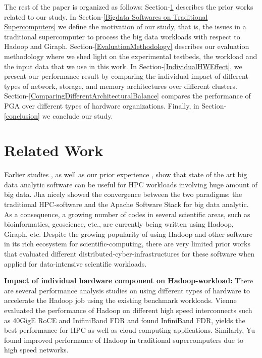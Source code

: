 \documentclass[conference]{IEEEtran}
\begin{document}
The rest of the paper is organized as follows:
Section-\ref{Related Work} describes the prior works related to our study. 
In Section-\ref{Bigdata Softwares on Traditional Supercomputers} we define the motivation of our study, that is, the issues in a traditional supercomputer to process the big data workloads with respect to Hadoop and Giraph. Section-\ref{EvaluationMethodology} describes our evaluation methodology where we shed light on the experimental testbeds, the workload and the input data that we use in this work. In Section-\ref{IndividualHWEffect}, we present our performance result by comparing the individual impact of different types of network, storage, and memory architectures over different clusters. Section-\ref{ComparingDifferentArchitecturalBalance} compares the performance of PGA over different types of hardware organizations. Finally, in Section-\ref{conclusion} we conclude our study.

\section {Related Work} \label{Related Work}
Earlier studies \cite{schadoop:fadika} \cite{schadoop:jha}, as well as our prior experience \cite{DBLP:conf/icpads/SatishKPPS14}, \cite{kondikoppa2012network} show that state of the art big data analytic software can be useful for HPC workloads involving huge amount of big data. Jha \cite{schadoop:jha} nicely showed the convergence between the two paradigms: the traditional HPC-software and the Apache Software Stack for big data analytic. As a consequence, a growing number of codes in several scientific areas, such as bioinformatics, geoscience, etc., are currently being written using Hadoop, Giraph, etc. Despite the growing popularity of using Hadoop and other software in its rich ecosystem for scientific-computing, there are very limited prior works that evaluated different distributed-cyber-infrastructures for these software when applied for data-intensive scientific workloads.

\textbf{Impact of individual hardware component on Hadoop-workload:}
There are several performance analysis studies on using different types of hardware to accelerate the Hadoop job using the existing benchmark workloads. Vienne \cite{ethib:vienne} evaluated the performance of Hadoop on different high speed interconnects such as 40GigE RoCE and InifiniBand FDR and found InfiniBand FDR, yields the best performance for HPC as well as cloud computing applications. Similarly, Yu \cite{ethib:yu} found improved performance of Hadoop in traditional supercomputers due to high speed networks.
\end{document}
